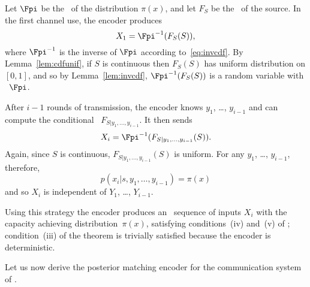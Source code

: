 Let $\Fpi$ be the \cdf\ of the distribution $\pi(x)$, and let $F_S$ be the \cdf\
of the source. In the first channel use, the encoder produces
\begin{equation}
  \label{eq:posteriorx1}
  X_1 = \Fpi^{-1}(F_S(S)),
\end{equation}
where $\Fpi^{-1}$ is the inverse of $\Fpi$ according to~\eqref{eq:invcdf}. By
Lemma~\ref{lem:cdfunif}, if $S$ is continuous then $F_S(S)$ has uniform
distribution on $[0,1]$, and so by Lemma~\ref{lem:invcdf}, $\Fpi^{-1}(F_S(S))$
is a random variable with \cdf\ $\Fpi$.

After $i-1$ rounds of transmission, the encoder knows $y_1$, \ldots, $y_{i-1}$
and can compute the conditional \cdf\ $F_{S|y_1, \ldots, y_{i-1}}$. It then
sends
\begin{equation}
  \label{eq:posteriorxi}
  X_i = \Fpi^{-1}(F_{S|y_1,\dots,y_{i-1}}(S)).
\end{equation}
Again, since $S$ is continuous, $F_{S|y_1, \dots, y_{i-1}}(S)$ is uniform. For
any $y_1$, \ldots, $y_{i-1}$, therefore, \begin{equation*}
  p(x_i|s, y_1, \dots, y_{i-1}) = \pi(x)
\end{equation*}
and so $X_i$ is independent of $Y_1$, \ldots, $Y_{i-1}$. 

Using this strategy the encoder produces an \iid\ sequence of inputs $X_i$
with the capacity achieving distribution~$\pi(x)$, satisfying conditions~(iv)
and~(v) of \thmref{tcntcfb}; condition~(iii) of the theorem is
trivially satisfied because the encoder is deterministic.

Let us now derive the posterior matching encoder for the communication system of
\exref{gaussfb}.


